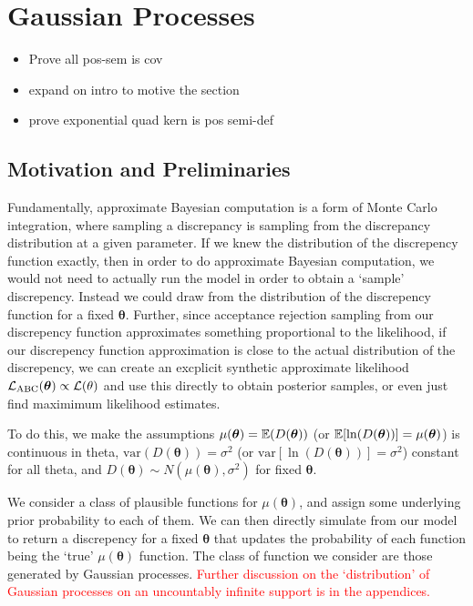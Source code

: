 \chapter{Gaussian Processes}

\begin{itemize}
    \item Prove all pos-sem is cov
    \item expand on intro to motive the section
    \item prove exponential quad kern is pos semi-def
\end{itemize}

\section{Motivation and Preliminaries}

Fundamentally, approximate Bayesian computation is a form of Monte Carlo
integration, where sampling a discrepancy is sampling from the discrepancy
distribution at a given parameter. If we knew the distribution of the
discrepency function exactly, then in order to do approximate
Bayesian computation, we would not need to actually run the model in order to
obtain a `sample' discrepency. Instead we could draw from the distribution of the
discrepency function for a fixed $\bm\theta.$ Further, since acceptance
rejection sampling from our discrepency function approximates something
proportional to the likelihood, if our discrepency function approximation is
close to the actual distribution of the discrepency, we can create an excplicit
synthetic approximate likelihood $\mathcal{L}_\text{ABC}(\bm\theta)\propto \mathcal{L}(\theta)$
and use this directly to obtain posterior samples, or even just find maximimum
likelihood estimates.

To do this, we make the assumptions $\mu(\bm\theta) = \operatorname{\mathbb{E}}(D(\bm\theta))$
(or $\operatorname{\mathbb{E}}[\ln(D(\bm\theta))] = \mu(\bm\theta)$) is
continuous in theta, $\mathrm{var}(D(\bm\theta)) = \sigma^2$
(or $\mathrm{var}[\ln(D(\bm\theta))] = \sigma^2$) constant for all theta,
and $D(\bm\theta) \sim N(\mu(\bm\theta), \sigma^2)$ for fixed $\bm\theta.$

We consider a class of plausible functions for $\mu(\bm\theta)$, and assign
some underlying prior
probability to each of them. We can then directly simulate from our model to
return a discrepency for a fixed $\bm\theta$ that updates the probability of
each function being the `true' $\mu(\bm\theta)$
function. The class of function we consider are those generated by Gaussian
processes. \textcolor{red}{
    Further discussion on the `distribution' of Gaussian processes on an
    uncountably infinite support is in the appendices.
}

